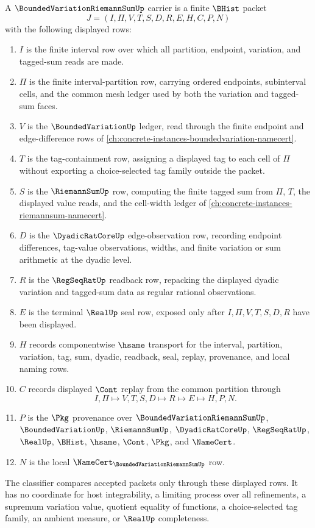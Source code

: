\begin{definition}
\label{def:bounded-variation-riemann-sum-carrier}
A $\BoundedVariationRiemannSumUp$ carrier is a finite $\BHist$ packet
$$
J=(I,\Pi,V,T,S,D,R,E,H,C,P,N)
$$
with the following displayed rows:
\begin{enumerate}
\item $I$ is the finite interval row over which all partition, endpoint, variation, and tagged-sum reads are made.
\item $\Pi$ is the finite interval-partition row, carrying ordered endpoints, subinterval cells, and the common mesh ledger used by both the variation and tagged-sum faces.
\item $V$ is the $\BoundedVariationUp$ ledger, read through the finite endpoint and edge-difference rows of \autoref{ch:concrete-instances-boundedvariation-namecert}.
\item $T$ is the tag-containment row, assigning a displayed tag to each cell of $\Pi$ without exporting a choice-selected tag family outside the packet.
\item $S$ is the $\RiemannSumUp$ row, computing the finite tagged sum from $\Pi$, $T$, the displayed value reads, and the cell-width ledger of \autoref{ch:concrete-instances-riemannsum-namecert}.
\item $D$ is the $\DyadicRatCoreUp$ edge-observation row, recording endpoint differences, tag-value observations, widths, and finite variation or sum arithmetic at the dyadic level.
\item $R$ is the $\RegSeqRatUp$ readback row, repacking the displayed dyadic variation and tagged-sum data as regular rational observations.
\item $E$ is the terminal $\RealUp$ seal row, exposed only after $I,\Pi,V,T,S,D,R$ have been displayed.
\item $H$ records componentwise $\hsame$ transport for the interval, partition, variation, tag, sum, dyadic, readback, seal, replay, provenance, and local naming rows.
\item $C$ records displayed $\Cont$ replay from the common partition through
$$
I,\Pi \longmapsto V,T,S,D \longmapsto R \longmapsto E \longmapsto H,P,N .
$$
\item $P$ is the $\Pkg$ provenance over $\BoundedVariationRiemannSumUp$, $\BoundedVariationUp$, $\RiemannSumUp$, $\DyadicRatCoreUp$, $\RegSeqRatUp$, $\RealUp$, $\BHist$, $\hsame$, $\Cont$, $\Pkg$, and $\NameCert$.
\item $N$ is the local $\NameCert_{\BoundedVariationRiemannSumUp}$ row.
\end{enumerate}
The classifier compares accepted packets only through these displayed rows. It has no coordinate for host integrability, a limiting process over all refinements, a supremum variation value, quotient equality of functions, a choice-selected tag family, an ambient measure, or $\RealUp$ completeness.
\end{definition}


